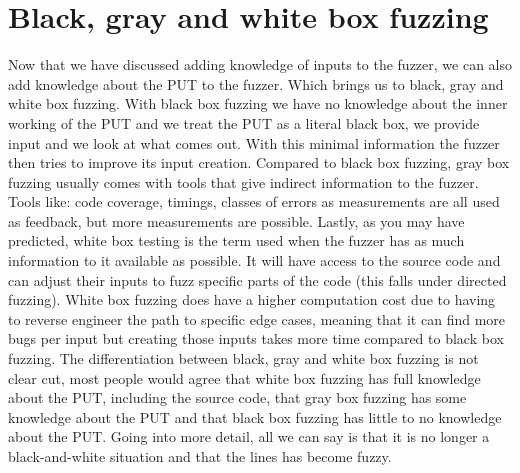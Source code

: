 \section{Black, gray and white box fuzzing}
\label{cha:2:BlackGrayWhiteFuzzing}
Now that we have discussed adding knowledge of inputs to the fuzzer, we can also add knowledge about the PUT to the fuzzer. Which brings us to black, gray and white box fuzzing. With black box fuzzing we have no knowledge about the inner working of the PUT and we treat the PUT as a literal black box, we provide input and we look at what comes out. With this minimal information the fuzzer then tries to improve its input creation. Compared to black box fuzzing, gray box fuzzing usually comes with tools that give indirect information to the fuzzer. Tools like: code coverage, timings, classes of errors as measurements are all used as feedback, but more measurements are possible. Lastly, as you may have predicted, white box testing is the term used when the fuzzer has as much information to it available as possible. It will have access to the source code and can adjust their inputs to fuzz specific parts of the code (this falls under directed fuzzing). White box fuzzing does have a higher computation cost due to having to reverse engineer the path to specific edge cases, meaning that it can find more bugs per input but creating those inputs takes more time compared to black box fuzzing. The differentiation between black, gray and white box fuzzing is not clear cut, most people would agree that white box fuzzing has full knowledge about the PUT, including the source code, that gray box fuzzing has some knowledge about the PUT and that black box fuzzing has little to no knowledge about the PUT. Going into more detail, all we can say is that it is no longer a black-and-white situation and that the lines has become fuzzy. 


